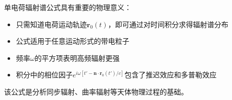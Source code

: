 \begin{derivationnote}[物理意义与应用]
单电荷辐射谱公式具有重要的物理意义：
\begin{itemize}
\item 只需知道电荷运动轨迹$\mathbf{r}_0(t)$，即可通过对时间积分求得辐射谱分布
\item 公式适用于任意运动形式的带电粒子
\item 频率$\omega$的平方项表明高频辐射更强
\item 积分中的相位因子$e^{i\omega [t' - \mathbf{n} \cdot \mathbf{r}_0(t')/c]}$包含了推迟效应和多普勒效应
\end{itemize}

该公式是分析同步辐射、曲率辐射等天体物理过程的基础。
\end{derivationnote}

